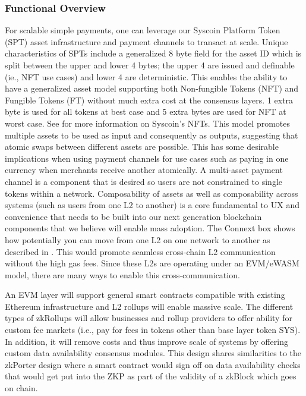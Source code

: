 \documentclass[peerreview]{ieeesyscoin}
\begin{document}
\subsubsection{Functional Overview}

For scalable simple payments, one can leverage our Syscoin Platform Token (SPT) asset infrastructure and payment channels to transact at scale. Unique characteristics of SPTs include a generalized 8 byte field for the asset ID which is split between the upper and lower 4 bytes; the upper 4 are issued and definable (ie., NFT use cases) and lower 4 are deterministic. This enables the ability to have a generalized asset model supporting both Non-fungible Tokens (NFT) and Fungible Tokens (FT) without much extra cost at the consensus layers. 1 extra byte is used for all tokens at best case and 5 extra bytes are used for NFT at worst case. See \cite{NFT21} for more information on Syscoin’s NFTs. This model promotes multiple assets to be used as input and consequently as outputs, suggesting that  atomic swaps between different assets are possible. This has some desirable implications when using payment channels for use cases such as paying in one currency when merchants receive another atomically. A multi-asset payment channel is a component that is desired so users are not constrained to single tokens within a network. Composability of assets as well as composability across systems (such as users from one L2 to another) is a core fundamental to UX and convenience that needs to be built into our next generation blockchain components that we believe will enable mass adoption. The Connext box shows how potentially you can move from one L2 on one network to another as described in \cite{Bhu21}. This would promote seamless cross-chain L2 communication without the high gas fees. Since these L2s are operating under an EVM/eWASM model, there are many ways to enable this cross-communication.

An EVM layer will support general smart contracts compatible with existing Ethereum infrastructure and L2 rollups will enable massive scale. The different types of zkRollups will allow businesses and rollup providers to offer ability for custom fee markets (i.e., pay for fees in tokens other than base layer token SYS). In addition, it will remove costs and thus improve scale of systems by offering custom data availability consensus modules. This design shares similarities to the zkPorter \cite{matter21} design where a smart contract would sign off on data availability checks that would get put into the ZKP as part of the validity of a zkBlock which goes on chain.
\end{document}
